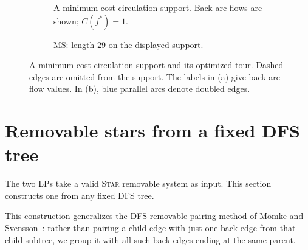 \documentclass[11pt]{amsart}
\newcommand{\1}{\mathbbm{1}}
\begin{document}
\begin{figure}[!htbp]
\centering
\begin{subfigure}[t]{.48\textwidth}\centering
{}
\caption{A minimum-cost circulation support. Back-arc flows are shown; $C(f^*)=1$.}
\label{fig:separation-ms-flow}
\end{subfigure}\hfill
\begin{subfigure}[t]{.48\textwidth}\centering
{}
\caption{MS: length $29$ on the displayed support.}
\label{fig:separation-ms-tour}
\end{subfigure}
\caption{A minimum-cost circulation support and its optimized tour.
Dashed edges are omitted from the support. The labels in (a) give
back-arc flow values. In (b), blue parallel arcs denote doubled edges.}
\label{fig:separation-ms-comparison}
\end{figure}
\endgroup











\FloatBarrier
\section{Removable stars from a fixed DFS tree}
\label{sec:DFS-removable-stars}

The two LPs take a valid \textsc{Star} removable system as input.
This section constructs one from any fixed DFS tree.


This construction generalizes the DFS removable-pairing method of
M\"omke and Svensson~\cite[Section~4]{MomkeSvensson}: rather than
pairing a child edge with just one back edge from that child subtree,
we group it with all such back edges ending at the same parent.
\end{document}
